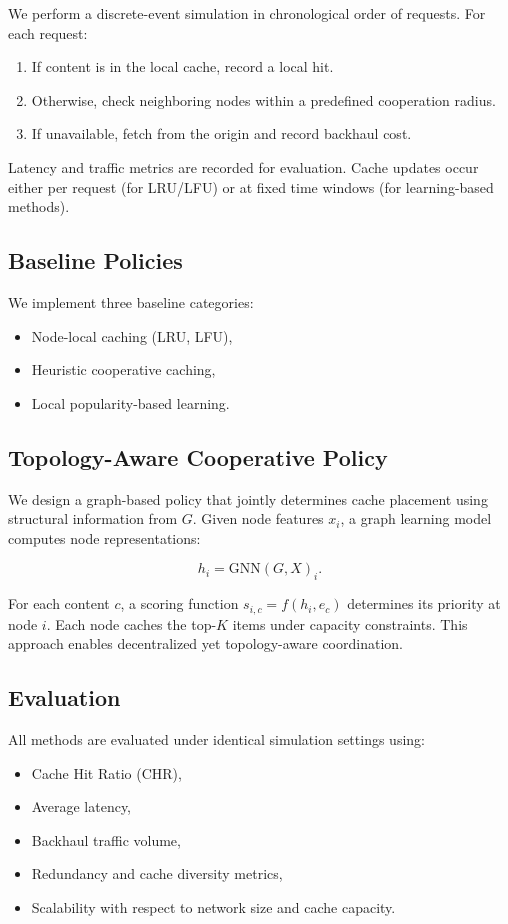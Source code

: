 We perform a discrete-event simulation in chronological order of requests. For each request:

\begin{enumerate}
    \item If content is in the local cache, record a local hit.
    \item Otherwise, check neighboring nodes within a predefined cooperation radius.
    \item If unavailable, fetch from the origin and record backhaul cost.
\end{enumerate}

Latency and traffic metrics are recorded for evaluation. Cache updates occur either per request (for LRU/LFU) or at fixed time windows (for learning-based methods).

\subsection{Baseline Policies}

We implement three baseline categories:

\begin{itemize}
    \item Node-local caching (LRU, LFU),
    \item Heuristic cooperative caching,
    \item Local popularity-based learning.
\end{itemize}

\subsection{Topology-Aware Cooperative Policy}

We design a graph-based policy that jointly determines cache placement using structural information from $G$. Given node features $x_i$, a graph learning model computes node representations:

\[
h_i = \mathrm{GNN}(G, X)_i.
\]

For each content $c$, a scoring function $s_{i,c} = f(h_i, e_c)$ determines its priority at node $i$. Each node caches the top-$K$ items under capacity constraints. This approach enables decentralized yet topology-aware coordination.

\subsection{Evaluation}

All methods are evaluated under identical simulation settings using:

\begin{itemize}
    \item Cache Hit Ratio (CHR),
    \item Average latency,
    \item Backhaul traffic volume,
    \item Redundancy and cache diversity metrics,
    \item Scalability with respect to network size and cache capacity.
\end{itemize}
